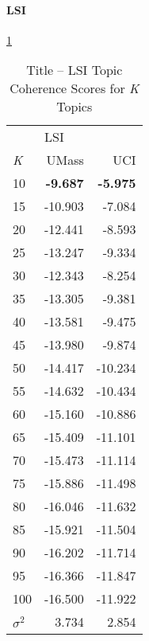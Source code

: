 \documentclass[letterpaper,12pt]{article}
\begin{document}
\paragraph{LSI}
\ref{tab:lsi_title_tc}
\begin{table}
	\caption{\label{tab:lsi_title_tc} Title -- LSI Topic Coherence Scores for \emph{K} Topics}
	\begin{center}
		\begin{tabular}{lrr}
			\toprule
			{} & \multicolumn{2}{l}{LSI} \\
			\emph{K} &   UMass &     UCI \\
			\midrule
			10  &  \textbf{-9.687} &  \textbf{-5.975} \\
			15  & -10.903 &  -7.084 \\
			20  & -12.441 &  -8.593 \\
			25  & -13.247 &  -9.334 \\
			30  & -12.343 &  -8.254 \\
			35  & -13.305 &  -9.381 \\
			40  & -13.581 &  -9.475 \\
			45  & -13.980 &  -9.874 \\
			50  & -14.417 & -10.234 \\
			55  & -14.632 & -10.434 \\
			60  & -15.160 & -10.886 \\
			65  & -15.409 & -11.101 \\
			70  & -15.473 & -11.114 \\
			75  & -15.886 & -11.498 \\
			80  & -16.046 & -11.632 \\
			85  & -15.921 & -11.504 \\
			90  & -16.202 & -11.714 \\
			95  & -16.366 & -11.847 \\
			100 & -16.500 & -11.922 \\
			\midrule
			$\sigma^2$ & 3.734 & 2.854 \\
			\bottomrule
			\end{tabular}
	\end{center}
\end{table}
\end{document}
